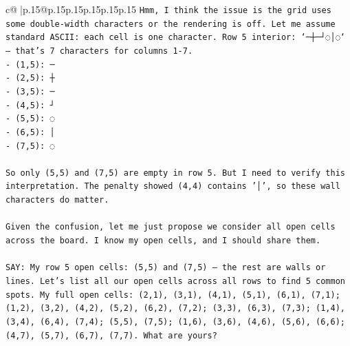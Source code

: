 \documentclass{article}
\begin{document}
{\begin{supertabular}{c@{$\;$}|p{.15\linewidth}@{}p{.15\linewidth}p{.15\linewidth}p{.15\linewidth}p{.15\linewidth}p{.15\linewidth}}
{{{\texttt{Hmm, I think the issue is the grid uses some double{-}width characters or the rendering is off. Let me assume standard ASCII: each cell is one character. Row 5 interior: `─┼─┘◌│◌` — that's 7 characters for columns 1{-}7.} \\
\texttt{{-} (1,5): ─} \\
\texttt{{-} (2,5): ┼} \\
\texttt{{-} (3,5): ─} \\
\texttt{{-} (4,5): ┘} \\
\texttt{{-} (5,5): ◌} \\
\texttt{{-} (6,5): │} \\
\texttt{{-} (7,5): ◌} \\
\\ 
\texttt{So only (5,5) and (7,5) are empty in row 5. But I need to verify this interpretation. The penalty showed (4,4) contains '│', so these wall characters do matter.} \\
\\ 
\texttt{Given the confusion, let me just propose we consider all open cells across the board. I know my open cells, and I should share them.} \\
\\ 
\texttt{SAY: My row 5 open cells: (5,5) and (7,5) — the rest are walls or lines. Let's list all our open cells across all rows to find 5 common spots. My full open cells: (2,1), (3,1), (4,1), (5,1), (6,1), (7,1); (1,2), (3,2), (4,2), (5,2), (6,2), (7,2); (3,3), (6,3), (7,3); (1,4), (3,4), (6,4), (7,4); (5,5), (7,5); (1,6), (3,6), (4,6), (5,6), (6,6); (4,7), (5,7), (6,7), (7,7). What are yours?} \\
            }
        }
    }
     \\ \\


\end{supertabular}}
\end{document}
